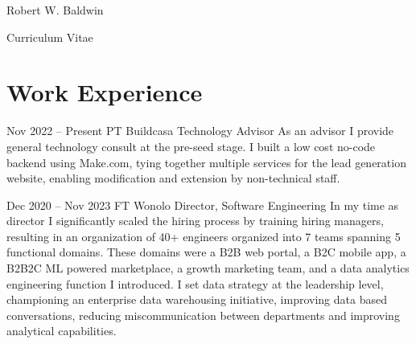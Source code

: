 \documentclass[
	10pt, %
]{FreemanCV}
\begin{document}
\begin{paracol}{2} %


\parbox[][0.11\textheight][c]{\linewidth}{ %
	\centering %
	
	{\sffamily\Huge Robert W. Baldwin} %
	
	\medskip %
	
	{\cursivefont\Huge\textcolor{headings}{Curriculum Vitae}}
	
	\vfill %
}


\section{Work Experience}




\jobentry
	{Nov 2022 -- Present} %
	{PT} %
	{Buildcasa} %
	{Technology Advisor} %
	{As an advisor I provide general technology consult at the pre-seed stage. I built a low cost no-code backend using Make.com, tying together multiple services for the lead generation website, enabling modification and extension by non-technical staff.} %


\jobentry
	{Dec 2020 -- Nov 2023} %
	{FT} %
	{Wonolo} %
	{Director, Software Engineering} %
	{In my time as director I significantly scaled the hiring process by training hiring managers, resulting in an organization of 40+ engineers organized into 7 teams spanning 5 functional domains. These domains were a B2B web portal, a B2C mobile app, a B2B2C ML powered marketplace, a growth marketing team, and a data analytics engineering function I introduced. I set data strategy at the leadership level, championing an enterprise data warehousing initiative, improving data based conversations, reducing miscommunication between departments and improving analytical capabilities.} %


\end{paracol}
\end{document}
